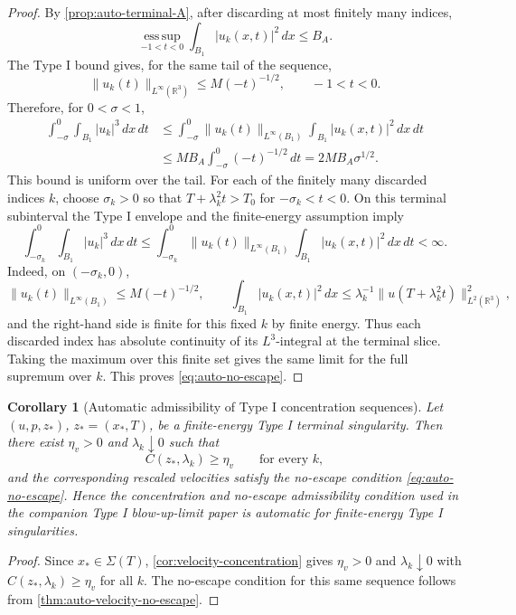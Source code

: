 \documentclass[11pt]{amsart}
\theoremstyle{plain}
\newtheorem{corollary}[corollary]{Corollary}
\theoremstyle{definition}
\theoremstyle{remark}
\begin{document}
\begin{proof}
By \cref{prop:auto-terminal-A}, after discarding at most finitely many indices,
\[
  \operatorname*{ess\,sup}_{-1<t<0}\int_{B_1}|u_k(x,t)|^2\,dx\le B_A .
\]
The Type I bound gives, for the same tail of the sequence,
\[
  \|u_k(t)\|_{L^\infty(\mathbb R^3)}
  \le M(-t)^{-1/2},
  \qquad -1<t<0 .
\]
Therefore, for \(0<\sigma<1\),
\[
\begin{aligned}
  \int_{-\sigma}^{0}\int_{B_1}|u_k|^3\,dx\,dt
  &\le
  \int_{-\sigma}^{0}\|u_k(t)\|_{L^\infty(B_1)}
       \int_{B_1}|u_k(x,t)|^2\,dx\,dt  \\
  &\le M B_A\int_{-\sigma}^{0}(-t)^{-1/2}\,dt
   =2M B_A\sigma^{1/2} .
\end{aligned}
\]
This bound is uniform over the tail.  For each of the finitely many discarded
indices \(k\), choose \(\sigma_k>0\) so that
\(T+\lambda_k^2t>T_0\) for \(-\sigma_k<t<0\).  On this terminal subinterval
the Type I envelope and the finite-energy assumption imply
\[
  \int_{-\sigma_k}^{0}\int_{B_1}|u_k|^3\,dx\,dt
  \le
  \int_{-\sigma_k}^{0}\|u_k(t)\|_{L^\infty(B_1)}
       \int_{B_1}|u_k(x,t)|^2\,dx\,dt
  <\infty .
\]
Indeed, on \((-\sigma_k,0)\),
\[
  \|u_k(t)\|_{L^\infty(B_1)}\le M(-t)^{-1/2},
  \qquad
  \int_{B_1}|u_k(x,t)|^2\,dx
  \le \lambda_k^{-1}\|u(T+\lambda_k^2t)\|_{L^2(\mathbb R^3)}^2,
\]
and the right-hand side is finite for this fixed \(k\) by finite energy.
Thus each discarded index has absolute continuity of its \(L^3\)-integral at
the terminal slice.  Taking the maximum over this finite set gives the same
limit for the full supremum over \(k\).  This proves
\eqref{eq:auto-no-escape}.
\end{proof}

\begin{corollary}[Automatic admissibility of Type I concentration sequences]
\label{cor:auto-paperI-admissibility}
Let \((u,p,z_*)\), \(z_*=(x_*,T)\), be a finite-energy Type I terminal
singularity.  Then there exist \(\eta_v>0\) and \(\lambda_k\downarrow0\) such
that
\[
  C(z_*,\lambda_k)\ge\eta_v
  \qquad\text{for every }k,
\]
and the corresponding rescaled velocities satisfy the no-escape condition
\eqref{eq:auto-no-escape}.  Hence the concentration and no-escape
admissibility condition used in the companion Type I blow-up-limit paper is
automatic for finite-energy Type I singularities.
\end{corollary}

\begin{proof}
Since \(x_*\in\Sigma(T)\), \cref{cor:velocity-concentration} gives
\(\eta_v>0\) and \(\lambda_k\downarrow0\) with
\(C(z_*,\lambda_k)\ge\eta_v\) for all \(k\).  The no-escape condition for this
same sequence follows from \cref{thm:auto-velocity-no-escape}.
\end{proof}
\end{document}
